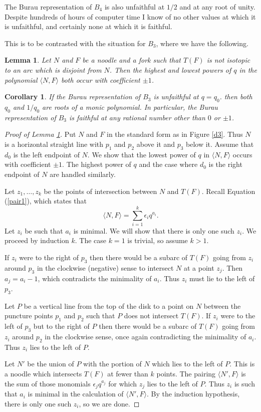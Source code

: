 \documentclass[10pt]{amsart}
\theoremstyle{plain}
\newtheorem{lem}[thm]{Lemma}
\newtheorem{cor}[thm]{Corollary}
\theoremstyle{definition}
\begin{document}
The Burau representation of $B_4$
is also unfaithful at $1/2$ and at any root of unity.
Despite hundreds of hours of computer time
I know of no other values at which it is unfaithful,
and certainly none at which it is faithful.

This is to be contrasted with the situation for $B_3$,
where we have the following.

\begin{lem}
\label{monic}
Let $N$ and $F$ be a noodle and a fork
such that $T(F)$ is not isotopic to an arc which is disjoint from $N$.
Then the highest and lowest powers of $q$
in the polynomial $\langle N,F \rangle$
both occur with coefficient $\pm 1$.
\end{lem}

\begin{cor}
If the Burau representation of $B_3$ is unfaithful at $q=q_0$.
then both $q_0$ and $1/q_0$ are roots of a monic polynomial.
In particular, the Burau representation of $B_3$
is faithful at any rational number other than $0$ or $\pm 1$.
\end{cor}

\begin{proof}[Proof of Lemma \ref{monic}]
Put $N$ and $F$ in the standard form as in Figure \ref{d3}.
Thus $N$ is a horizontal straight line
with $p_1$ and $p_2$ above it
and $p_3$ below it.
Assume that $d_0$ is the left endpoint of $N$.
We show that the lowest power of $q$ in $\langle N,F \rangle$
occurs with coefficient $\pm 1$.
The highest power of $q$
and the case where $d_0$ is the right endpoint of $N$
are handled similarly.

Let $z_1,\dots,z_k$ be the points of intersection between $N$ and $T(F)$.
Recall Equation (\ref{pair1}), which states that
$$\langle N,F \rangle = \sum_{i=1}^k \epsilon_i q^{a_i}.$$
Let $z_i$ be such that $a_i$ is minimal.
We will show that there is only one such $z_i$.
We proceed by induction $k$. 
The case $k=1$ is trivial, so assume $k>1$.

If $z_i$ were to the right of $p_3$
then there would be a subarc of $T(F)$
going from $z_i$ around $p_3$
in the clockwise (negative) sense
to intersect $N$ at a point $z_j$.
Then $a_j = a_i-1$, which contradicts the minimality of $a_i$.
Thus $z_i$ must lie to the left of $p_3$.

Let $P$ be a vertical line from the top of the disk
to a point on $N$ between the puncture points $p_1$ and $p_2$
such that $P$ does not intersect $T(F)$.
If $z_i$ were to the left of $p_3$ but to the right of $P$
then there would be a subarc of $T(F)$
going from $z_i$ around $p_2$
in the clockwise sense,
once again contradicting the minimality of $a_i$.
Thus $z_i$ lies to the left of $P$.

Let $N'$ be the union of $P$
with the portion of $N$ which lies to the left of $P$.
This is a noodle
which intersects $T(F)$ at fewer than $k$ points.
The pairing $\langle N',F \rangle$
is the sum of those monomials $\epsilon_j q^{a_j}$
for which $z_j$ lies to the left of $P$.
Thus $z_i$ is such that $a_i$ is minimal
in the calculation of $\langle N',F \rangle$.
By the induction hypothesis,
there is only one such $z_i$,
so we are done.
\end{proof}
\end{document}
